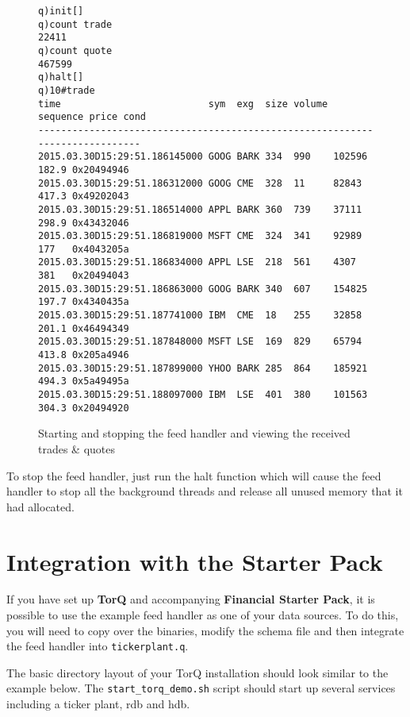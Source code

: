 \begin{figure}
\begin{lstlisting}
q)init[]
q)count trade
22411
q)count quote
467599
q)halt[]
q)10#trade
time                          sym  exg  size volume sequence price cond                  
-----------------------------------------------------------------------------
2015.03.30D15:29:51.186145000 GOOG BARK 334  990    102596   182.9 0x20494946
2015.03.30D15:29:51.186312000 GOOG CME  328  11     82843    417.3 0x49202043
2015.03.30D15:29:51.186514000 APPL BARK 360  739    37111    298.9 0x43432046
2015.03.30D15:29:51.186819000 MSFT CME  324  341    92989    177   0x4043205a
2015.03.30D15:29:51.186834000 APPL LSE  218  561    4307     381   0x20494043
2015.03.30D15:29:51.186863000 GOOG BARK 340  607    154825   197.7 0x4340435a
2015.03.30D15:29:51.187741000 IBM  CME  18   255    32858    201.1 0x46494349
2015.03.30D15:29:51.187848000 MSFT LSE  169  829    65794    413.8 0x205a4946
2015.03.30D15:29:51.187899000 YHOO BARK 285  864    185921   494.3 0x5a49495a
2015.03.30D15:29:51.188097000 IBM  LSE  401  380    101563   304.3 0x20494920
\end{lstlisting}
\caption{Starting and stopping the feed handler and viewing the received trades \& quotes}
\end{figure}

To stop the feed handler, just run the halt function which will cause the feed handler to stop all the background threads and release all unused memory that it had allocated.

\section{Integration with the Starter Pack}

If you have set up \textbf{TorQ} and accompanying \textbf{Financial Starter Pack}, it is possible
to use the example feed handler as one of your data sources. To do this, you will need to copy over the binaries, modify the schema file and then integrate the feed handler into \verb|tickerplant.q|.

The basic directory layout of your TorQ installation should look similar to the example below. The \verb|start_torq_demo.sh| script should start up several services including a ticker plant, rdb and hdb.

